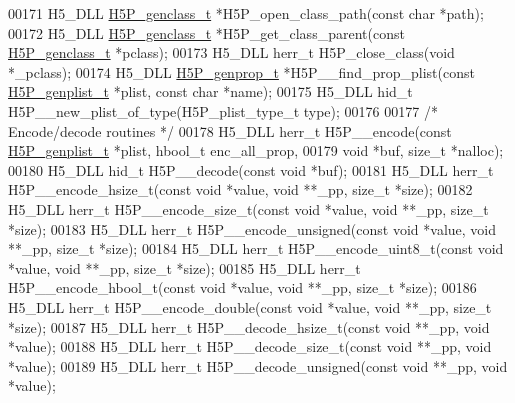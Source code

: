 \begin{DoxyCode}
00171 H5\_DLL \hyperlink{struct_h5_p__genclass__t}{H5P\_genclass\_t} *H5P\_open\_class\_path(\textcolor{keyword}{const} \textcolor{keywordtype}{char} *path);
00172 H5\_DLL \hyperlink{struct_h5_p__genclass__t}{H5P\_genclass\_t} *H5P\_get\_class\_parent(\textcolor{keyword}{const} \hyperlink{struct_h5_p__genclass__t}{H5P\_genclass\_t} *pclass);
00173 H5\_DLL herr\_t H5P\_close\_class(\textcolor{keywordtype}{void} *\_pclass);
00174 H5\_DLL \hyperlink{struct_h5_p__genprop__t}{H5P\_genprop\_t} *H5P\_\_find\_prop\_plist(\textcolor{keyword}{const} \hyperlink{struct_h5_p__genplist__t}{H5P\_genplist\_t} *plist, \textcolor{keyword}{const} \textcolor{keywordtype}{
      char} *name);
00175 H5\_DLL hid\_t H5P\_\_new\_plist\_of\_type(H5P\_plist\_type\_t type);
00176 
00177 \textcolor{comment}{/* Encode/decode routines */}
00178 H5\_DLL herr\_t H5P\_\_encode(\textcolor{keyword}{const} \hyperlink{struct_h5_p__genplist__t}{H5P\_genplist\_t} *plist, hbool\_t enc\_all\_prop,
00179     \textcolor{keywordtype}{void} *buf, \textcolor{keywordtype}{size\_t} *nalloc);
00180 H5\_DLL hid\_t H5P\_\_decode(\textcolor{keyword}{const} \textcolor{keywordtype}{void} *buf);
00181 H5\_DLL herr\_t H5P\_\_encode\_hsize\_t(\textcolor{keyword}{const} \textcolor{keywordtype}{void} *value, \textcolor{keywordtype}{void} **\_pp, \textcolor{keywordtype}{size\_t} *size);
00182 H5\_DLL herr\_t H5P\_\_encode\_size\_t(\textcolor{keyword}{const} \textcolor{keywordtype}{void} *value, \textcolor{keywordtype}{void} **\_pp, \textcolor{keywordtype}{size\_t} *size);
00183 H5\_DLL herr\_t H5P\_\_encode\_unsigned(\textcolor{keyword}{const} \textcolor{keywordtype}{void} *value, \textcolor{keywordtype}{void} **\_pp, \textcolor{keywordtype}{size\_t} *size);
00184 H5\_DLL herr\_t H5P\_\_encode\_uint8\_t(\textcolor{keyword}{const} \textcolor{keywordtype}{void} *value, \textcolor{keywordtype}{void} **\_pp, \textcolor{keywordtype}{size\_t} *size);
00185 H5\_DLL herr\_t H5P\_\_encode\_hbool\_t(\textcolor{keyword}{const} \textcolor{keywordtype}{void} *value, \textcolor{keywordtype}{void} **\_pp, \textcolor{keywordtype}{size\_t} *size);
00186 H5\_DLL herr\_t H5P\_\_encode\_double(\textcolor{keyword}{const} \textcolor{keywordtype}{void} *value, \textcolor{keywordtype}{void} **\_pp, \textcolor{keywordtype}{size\_t} *size);
00187 H5\_DLL herr\_t H5P\_\_decode\_hsize\_t(\textcolor{keyword}{const} \textcolor{keywordtype}{void} **\_pp, \textcolor{keywordtype}{void} *value);
00188 H5\_DLL herr\_t H5P\_\_decode\_size\_t(\textcolor{keyword}{const} \textcolor{keywordtype}{void} **\_pp, \textcolor{keywordtype}{void} *value);
00189 H5\_DLL herr\_t H5P\_\_decode\_unsigned(\textcolor{keyword}{const} \textcolor{keywordtype}{void} **\_pp, \textcolor{keywordtype}{void} *value);

\end{DoxyCode}
